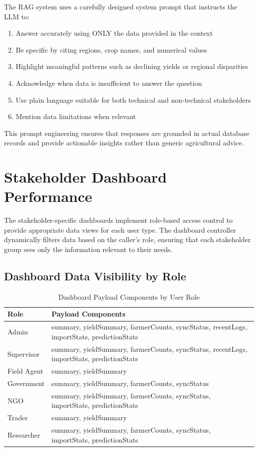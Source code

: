 The RAG system uses a carefully designed system prompt that instructs the LLM to:
\begin{enumerate}
  \item Answer accurately using ONLY the data provided in the context
  \item Be specific by citing regions, crop names, and numerical values
  \item Highlight meaningful patterns such as declining yields or regional disparities
  \item Acknowledge when data is insufficient to answer the question
  \item Use plain language suitable for both technical and non-technical stakeholders
  \item Mention data limitations when relevant
\end{enumerate}

This prompt engineering ensures that responses are grounded in actual database records and provide actionable insights rather than generic agricultural advice.

\section{Stakeholder Dashboard Performance}

The stakeholder-specific dashboards implement role-based access control to provide appropriate data views for each user type. The dashboard controller dynamically filters data based on the caller's role, ensuring that each stakeholder group sees only the information relevant to their needs.

\subsection{Dashboard Data Visibility by Role}

\begin{table}[H]
\centering
\caption{Dashboard Payload Components by User Role}
\label{tab:payload-role}
\begin{tabularx}{\textwidth}{lX}
\toprule
\textbf{Role} & \textbf{Payload Components} \\
\midrule
Admin & summary, yieldSummary, farmerCounts, syncStatus, recentLogs, importStats, predictionStats \\
Supervisor & summary, yieldSummary, farmerCounts, syncStatus, recentLogs, importStats, predictionStats \\
Field Agent & summary, yieldSummary \\
Government & summary, yieldSummary, farmerCounts, syncStatus \\
NGO & summary, yieldSummary, farmerCounts, syncStatus, importStats, predictionStats \\
Trader & summary, yieldSummary \\
Researcher & summary, yieldSummary, farmerCounts, syncStatus, importStats, predictionStats \\
\bottomrule
\end{tabularx}
\end{table}

